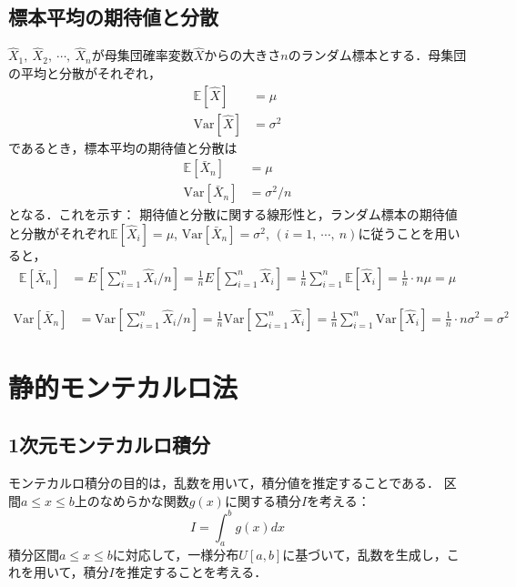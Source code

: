 \subsection{標本平均の期待値と分散}
$\hat{X}_1,\ \hat{X}_2,\ \cdots,\ \hat{X}_n$が母集団確率変数$\hat{X}$からの大きさ$n$のランダム標本とする．母集団の平均と分散がそれぞれ，
\begin{align}
    \mathbb{E}[\hat{X}] &= \mu\\[10pt]
    \text{Var}[\hat{X}] &= \sigma^2
\end{align}
であるとき，標本平均の期待値と分散は
\begin{align}
    \mathbb{E}[\bar{X}_n] &= \mu\\[10pt]
    \text{Var}[\bar{X}_n] &= \sigma^2 / n
\end{align}
となる．これを示す：
期待値と分散に関する線形性と，ランダム標本の期待値と分散がそれぞれ$\mathbb{E}[\hat{X}_i] = \mu$, $\text{Var}[\bar{X}_n] = \sigma^2$, $(i=1,\ \cdots,\ n)$に従うことを用いると，
\begin{align}
    \mathbb{E}[\bar{X}_n] &= E\left[\sum_{i=1}^n\hat{X}_i / n\right]
    =\frac{1}{n}E\left[\sum_{i=1}^n\hat{X}_i\right]
    =\frac{1}{n}\sum_{i=1}^n\mathbb{E}[\hat{X}_i]
    =\frac{1}{n}\cdot n \mu
    =\mu
\end{align}


\begin{align}
    \text{Var}[\bar{X}_n] &= \text{Var}\left[\sum_{i=1}^n\hat{X}_i / n\right]
    =\frac{1}{n}\text{Var}\left[\sum_{i=1}^n\hat{X}_i\right]
    =\frac{1}{n}\sum_{i=1}^n\text{Var}[\hat{X}_i]
    =\frac{1}{n}\cdot n \sigma^2
    =\sigma^2
\end{align}

\section{静的モンテカルロ法}
\subsection{1次元モンテカルロ積分}
モンテカルロ積分の目的は，乱数を用いて，積分値を推定することである．
区間$a\leq x \leq b$上のなめらかな関数$g(x)$に関する積分$I$を考える：
\begin{equation}
    I = \int_{a}^{b} g(x) dx
\end{equation}
積分区間$a\leq x \leq b$に対応して，一様分布$U[a,b]$に基づいて，乱数を生成し，これを用いて，積分$I$を推定することを考える．

